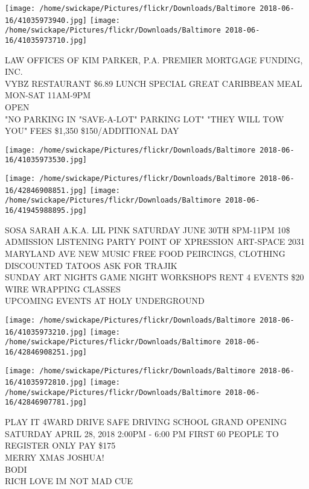 \documentclass[10pt,letterpaper]{article}
\begin{document}
\texttt{[image: /home/swickape/Pictures/flickr/Downloads/Baltimore 2018-06-16/41035973940.jpg]}
\texttt{[image: /home/swickape/Pictures/flickr/Downloads/Baltimore 2018-06-16/41035973710.jpg]}

LAW OFFICES OF KIM PARKER, P.A. PREMIER MORTGAGE FUNDING, INC.\\
VYBZ RESTAURANT \$6.89 LUNCH SPECIAL GREAT CARIBBEAN MEAL MON{-}SAT 11AM{-}9PM\\
OPEN\\
"NO PARKING IN "SAVE{-}A{-}LOT" PARKING LOT"  "THEY WILL TOW YOU"  FEES \$1,350 \$150/ADDITIONAL DAY\\
\pagebreak

\texttt{[image: /home/swickape/Pictures/flickr/Downloads/Baltimore 2018-06-16/41035973530.jpg]}

\vspace{0.25in}
\texttt{[image: /home/swickape/Pictures/flickr/Downloads/Baltimore 2018-06-16/42846908851.jpg]}
\texttt{[image: /home/swickape/Pictures/flickr/Downloads/Baltimore 2018-06-16/41945988895.jpg]}

SOSA SARAH A.K.A. LIL PINK SATURDAY JUNE 30TH 8PM{-}11PM 10\$ ADMISSION LISTENING PARTY POINT OF XPRESSION ART{-}SPACE 2031 MARYLAND AVE NEW MUSIC FREE FOOD PEIRCINGS, CLOTHING DISCOUNTED TATOOS ASK FOR TRAJIK\\
SUNDAY ART NIGHTS GAME NIGHT WORKSHOPS RENT 4 EVENTS \$20 WIRE WRAPPING CLASSES\\
UPCOMING EVENTS AT HOLY UNDERGROUND\\
\pagebreak

\texttt{[image: /home/swickape/Pictures/flickr/Downloads/Baltimore 2018-06-16/41035973210.jpg]}
\texttt{[image: /home/swickape/Pictures/flickr/Downloads/Baltimore 2018-06-16/42846908251.jpg]}

\texttt{[image: /home/swickape/Pictures/flickr/Downloads/Baltimore 2018-06-16/41035972810.jpg]}
\texttt{[image: /home/swickape/Pictures/flickr/Downloads/Baltimore 2018-06-16/42846907781.jpg]}

PLAY IT 4WARD DRIVE SAFE DRIVING SCHOOL GRAND OPENING SATURDAY APRIL 28, 2018 2:00PM {-} 6:00 PM FIRST 60 PEOPLE TO REGISTER ONLY PAY \$175\\
MERRY XMAS JOSHUA!\\
BODI\\
RICH LOVE IM NOT MAD CUE\\
\pagebreak
\end{document}
